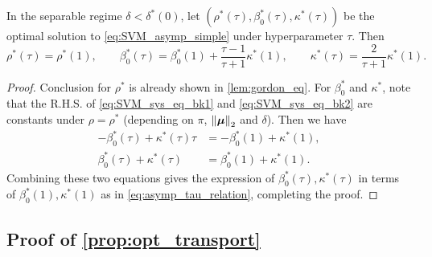 \begin{cor}\label{cor:asymp_tau_relation}
        In the separable regime $\delta < \delta^*(0)$, let $(\rho^*(\tau), \beta_0^*(\tau), \kappa^*(\tau))$ be the optimal solution to \cref{eq:SVM_asymp_simple} under hyperparameter $\tau$. Then
        \begin{equation}\label{eq:asymp_tau_relation}
		    \rho^*(\tau) = \rho^*(1),
        \qquad
        \beta_0^*(\tau) = \beta_0^*(1) + \frac{\tau - 1}{\tau + 1} \kappa^*(1),
        \qquad
        \kappa^*(\tau) = \frac{2}{\tau + 1} \kappa^*(1).
	\end{equation}
\end{cor}
\begin{proof}
    Conclusion for $\rho^*$ is already shown in \cref{lem:gordon_eq}. For $\beta_0^*$ and $\kappa^*$, note that the R.H.S. of \cref{eq:SVM_sys_eq_bk1} and \eqref{eq:SVM_sys_eq_bk2} are constants under $\rho = \rho^*$ (depending on $\pi$, $\left\|{\text{\boldmath $\mu$}}\right\|_2$ and $\delta$). Then we have
    \begin{align*}
        - \beta_0^*(\tau) + \kappa^*(\tau) \tau & = - \beta_0^*(1) + \kappa^*(1), \\
	\beta_0^*(\tau) + \kappa^*(\tau) & = \beta_0^*(1) + \kappa^*(1).
    \end{align*}
    Combining these two equations gives the expression of $\beta_0^*(\tau), \kappa^*(\tau)$ in terms of $\beta_0^*(1), \kappa^*(1)$ as in \cref{eq:asymp_tau_relation}, completing the proof.
\end{proof}








\subsection{Proof of \cref{prop:opt_transport}}

